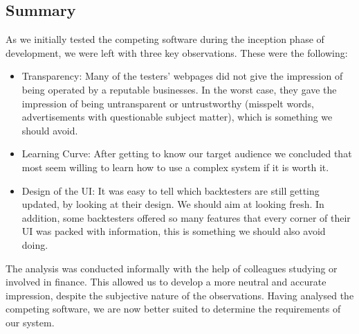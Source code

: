 \documentclass[main.tex]{subfiles}
\begin{document}
\subsection{Summary}
\label{reliability}

As we initially tested the competing software during the inception phase of development, we were left with three key observations. These were the following:

\begin{itemize}
    \item Transparency: Many of the testers' webpages did not give the impression of being operated by a reputable businesses. In the worst case, they gave the impression of being untransparent or untrustworthy (misspelt words, advertisements with questionable subject matter), which is something we should avoid.
    \item Learning Curve: After getting to know our target audience we concluded that most seem willing to learn how to use a complex system if it is worth it.
    \item Design of the UI: It was easy to tell which backtesters are still getting updated, by looking at their design. We should aim at looking fresh. In addition, some backtesters offered so many features that every corner of their UI was packed with information, this is something we should also avoid doing.
\end{itemize}

The analysis was conducted informally with the help of colleagues studying or involved in finance. This allowed us to develop a more neutral and accurate impression, despite the subjective nature of the observations. Having analysed the competing software, we are now better suited to determine the requirements of our system. 
\end{document}
